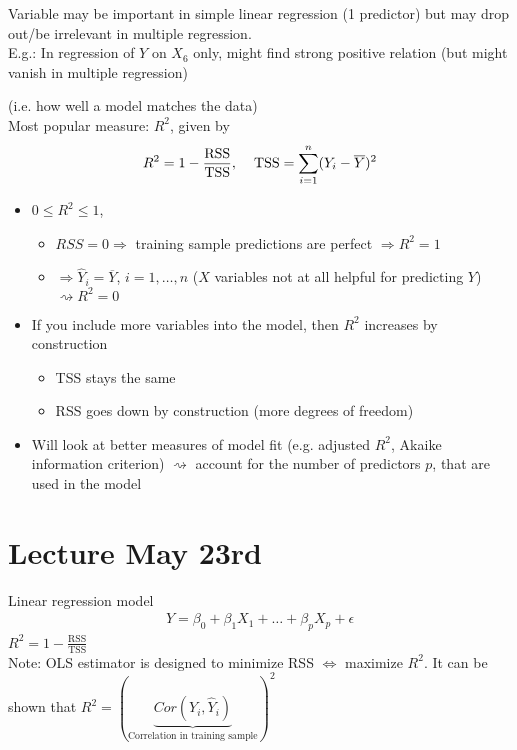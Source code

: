 \documentclass[11pt,a4paper,numbers=endperiod]{scrartcl}
\newcommand{\id}{\hspace*{4mm}}
\newcommand{\tit}[1]{\begin{large} \underline{\text{#1}}\end{large}}
\begin{document}
{\tit{Note:} Variable may be important in simple linear regression (1 predictor) but may drop out/be irrelevant in multiple regression.\\
E.g.: In regression of $Y$ on $X_6$ only, might find strong positive relation (but might vanish in multiple regression)\\

\tit{Model fit} (i.e. how well a model matches  the data)\\
Most popular measure: $R^2$, given by \begin{align*}
	R^2 = 1 - \frac{\text{RSS}}{\text{TSS}}, \id \text{TSS} = \sum\limits_{i = 1}^n (Y_i - \overline{Y})^2
\end{align*}

\tit{Properties:} \begin{itemize}
	\item $0 \leq R^2 \leq 1$, \begin{itemize}
		\item $RSS = 0 \Rightarrow$ training sample predictions are perfect $\Rightarrow R^2 = 1$
		\item {} $\Rightarrow \hat{Y}_i = \overline{Y}$, $i = 1, \ldots, n$ ($X$ variables not at all helpful for predicting $Y$) $\rightsquigarrow R^2 = 0$
	\end{itemize} 
	\item If you include more variables into the model, then $R^2$ increases by construction
	\begin{itemize}
		\item TSS stays the same
		\item RSS goes down by construction (more degrees of freedom) 
	\end{itemize}
	\item Will look at better measures of model fit (e.g. adjusted $R^2$, Akaike information criterion) $\rightsquigarrow$ account for the number of predictors $p$, that are used in the model
\end{itemize}

\section{Lecture May 23rd} 

Linear regression model \begin{align*}
	Y = \beta_0 + \beta_1X_1 + \ldots + \beta_p X_p + \epsilon
\end{align*}
$R^2 = 1 - \frac{\text{RSS}}{\text{TSS}}$\\
Note: OLS estimator is designed to minimize RSS $\Leftrightarrow$ maximize $R^2$. It can be shown that $R^2 = (\underbrace{Cor(Y_i, \hat{Y}_i)}_{\text{Correlation in training sample}})^2$\\

}
\end{document}
